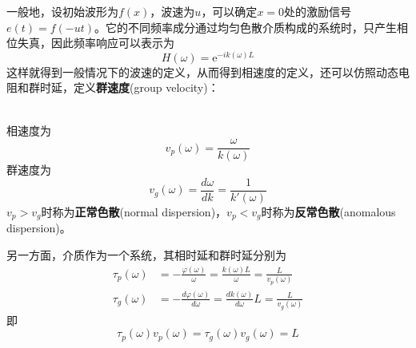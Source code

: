 \documentclass{ctexbook}
\begin{document}
一般地，设初始波形为$f(x)$，波速为$u$，可以确定$x=0$处的激励信号$e(t)=f(-ut)$。它的不同频率成分通过均匀色散介质构成的系统时，只产生相位失真，因此频率响应可以表示为
\[H(\omega)=\mathrm{e}^{-ik(\omega)L}\]
这样就得到一般情况下的波速的定义，从而得到相速度的定义，还可以仿照动态电阻和群时延，定义\textbf{群速度}(group velocity)：
\begin{definition}[相速度和群速度]
    \quad\\
    相速度为\[v_p(\omega)=\frac{\omega}{k(\omega)}\]
    群速度为\[v_g(\omega)=\frac{d\omega}{dk}=\frac{1}{k'(\omega)}\]
    $v_p>v_g$时称为\textbf{正常色散}(normal dispersion)，$v_p<v_g$时称为\textbf{反常色散}(anomalous dispersion)。
\end{definition}
另一方面，介质作为一个系统，其相时延和群时延分别为
\begin{align*}
    \tau_p(\omega)&=-\frac{\varphi(\omega)}{\omega}=\frac{k(\omega)L}{\omega}=\frac{L}{v_p(\omega)}\\
    \tau_g(\omega)&=-\frac{d\varphi(\omega)}{d\omega}=\frac{dk(\omega)}{d\omega}L=\frac{L}{v_g(\omega)}
\end{align*}
即\[\tau_p(\omega)v_p(\omega)=\tau_g(\omega)v_g(\omega)=L\]
\end{document}
